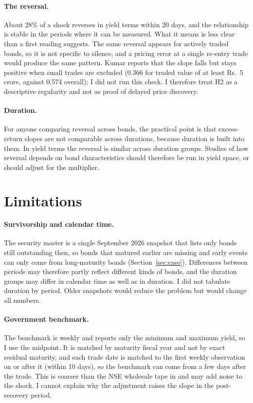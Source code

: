 \documentclass[a4paper,11pt]{article}
\begin{document}
\paragraph{The reversal.} About 28\% of a shock reverses in yield terms within 20 days, and the relationship is stable in the periods where it can be measured. What it means is less clear than a first reading suggests. The same reversal appears for actively traded bonds, so it is not specific to silence, and a pricing error at a single re-entry trade would produce the same pattern. Kumar \cite{kumar2026delayed} reports that the slope falls but stays positive when small trades are excluded (0.366 for traded value of at least Rs.~5 crore, against 0.574 overall); I did not run this check. I therefore treat H2 as a descriptive regularity and not as proof of delayed price discovery.

\paragraph{Duration.} For anyone comparing reversal across bonds, the practical point is that excess-return slopes are not comparable across durations, because duration is built into them. In yield terms the reversal is similar across duration groups. Studies of how reversal depends on bond characteristics should therefore be run in yield space, or should adjust for the multiplier.

\section{Limitations}\label{sec:limits}
\paragraph{Survivorship and calendar time.} The security master is a single September 2026 snapshot that lists only bonds still outstanding then, so bonds that matured earlier are missing and early events can only come from long-maturity bonds (Section~\ref{sec:case}). Differences between periods may therefore partly reflect different kinds of bonds, and the duration groups may differ in calendar time as well as in duration. I did not tabulate duration by period. Older snapshots would reduce the problem but would change all numbers.

\paragraph{Government benchmark.} The benchmark is weekly and reports only the minimum and maximum yield, so I use the midpoint. It is matched by maturity fiscal year and not by exact residual maturity, and each trade date is matched to the first weekly observation on or after it (within 10 days), so the benchmark can come from a few days after the trade. This is coarser than the NSE wholesale tape in \cite{kumar2026delayed} and may add noise to the shock. I cannot explain why the adjustment raises the slope in the post-recovery period.
\end{document}
